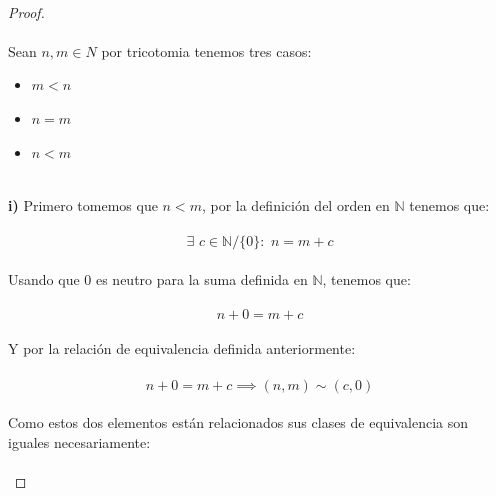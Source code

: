 \documentclass[11pt,letterpaper]{article}
\newcommand{\N}{\mathbb{N}}
\newcommand{\Z}{\mathbb{Z}}
\begin{document}
\,\\
\begin{proof}\,\\
    \,\\
    Sean $n,m\in N$ por tricotomia tenemos tres casos:\,\\
    \begin{itemize}
        \item $m<n$
        \item $n=m$
        \item $n<m$
    \end{itemize}\,\\
    \textbf{i)}\,\,Primero tomemos que $n<m$, por la definici\'on del orden en $\N$ tenemos que:\,\\
    \,\\
    \begin{equation*}
        \exists\,\,c\in \N/\{0\}:\,\,n=m+c
    \end{equation*}\,\\
    Usando que $0$ es neutro para la suma definida en $\N$, tenemos que:\,\\
    \,\\
    \begin{equation*}
        n+0=m+c
    \end{equation*}\,\\
    Y por la relaci\'on de equivalencia definida anteriormente:\,\\
    \,\\
    \begin{equation*}
        n+0=m+c\implies (n,m)\sim(c,0)
    \end{equation*}\,\\
    Como estos dos elementos est\'an relacionados sus clases de equivalencia son iguales necesariamente:\,\\
    \,\\

\end{proof}
\end{document}
